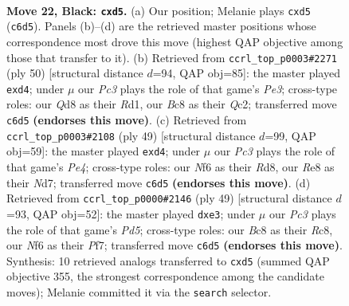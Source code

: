 \documentclass[11pt]{article}
\begin{document}
\clearpage

\begin{figure}[p]\centering
\begin{subfigure}{0.46\textwidth}\centering
\resizebox{\linewidth}{!}{%
\newchessgame
\chessboard[
  setfen={2bqrk2/Q1p2p1p/P1p2n2/2PP2N1/1r6/8/2P2PP1/R1B2RK1 b - - 0 22},
  showmover=false,
  pgfstyle=straightmove, color=movearrow, markmove={c6-d5}
]}
\caption{}
\end{subfigure}\hfill
\begin{subfigure}{0.46\textwidth}\centering
\resizebox{\linewidth}{!}{%
\newchessgame
\chessboard[
  setfen={1r1r2k1/2n1qp2/b5p1/3pP3/Np1p4/4P1P1/1PQ3B1/3RR1K1 w - - 0 26},
  showmover=false,
  pgfstyle=straightmove, color=movearrow, markmove={e3-d4}
]}
\caption{}
\end{subfigure}
\\[4pt]
\begin{subfigure}{0.46\textwidth}\centering
\resizebox{\linewidth}{!}{%
\newchessgame
\chessboard[
  setfen={3r4/pPknqp2/2p4r/4p2P/3PP3/2Q5/1P6/2KR1B1R b - - 0 25},
  showmover=false,
  pgfstyle=straightmove, color=movearrow, markmove={e5-d4}
]}
\caption{}
\end{subfigure}\hfill
\begin{subfigure}{0.46\textwidth}\centering
\resizebox{\linewidth}{!}{%
\newchessgame
\chessboard[
  setfen={1rr2k2/4qpp1/2B2n1p/8/Q1pp4/4P2P/PP3PP1/1RR3K1 b - - 0 25},
  showmover=false,
  pgfstyle=straightmove, color=movearrow, markmove={d4-e3}
]}
\caption{}
\end{subfigure}
\caption{\textbf{Move 22, Black: \texttt{cxd5}.} (a) Our position; Melanie plays \texttt{cxd5} (\texttt{c6d5}). Panels (b)--(d) are the retrieved master positions whose correspondence most drove this move (highest QAP objective among those that transfer to it). (b) Retrieved from \texttt{ccrl\_top\_p0003\#2271} (ply 50) [structural distance $d$=94, QAP obj=85]: the master played \texttt{exd4}; under $\mu$ our \emph{Pc3} plays the role of that game's \emph{Pe3}; cross-type roles: our \emph{Q}d8 as their \emph{R}d1, our \emph{B}c8 as their \emph{Q}c2; transferred move \texttt{c6d5} \textbf{(endorses this move)}. (c) Retrieved from \texttt{ccrl\_top\_p0003\#2108} (ply 49) [structural distance $d$=99, QAP obj=59]: the master played \texttt{exd4}; under $\mu$ our \emph{Pc3} plays the role of that game's \emph{Pe4}; cross-type roles: our \emph{N}f6 as their \emph{R}d8, our \emph{R}e8 as their \emph{N}d7; transferred move \texttt{c6d5} \textbf{(endorses this move)}. (d) Retrieved from \texttt{ccrl\_top\_p0000\#2146} (ply 49) [structural distance $d$=93, QAP obj=52]: the master played \texttt{dxe3}; under $\mu$ our \emph{Pc3} plays the role of that game's \emph{Pd5}; cross-type roles: our \emph{B}c8 as their \emph{R}c8, our \emph{N}f6 as their \emph{P}f7; transferred move \texttt{c6d5} \textbf{(endorses this move)}. Synthesis: 10 retrieved analogs transferred to \texttt{cxd5} (summed QAP objective 355, the strongest correspondence among the candidate moves); Melanie committed it via the \texttt{search} selector.}
\label{fig:thought-m43}
\end{figure}
\end{document}
